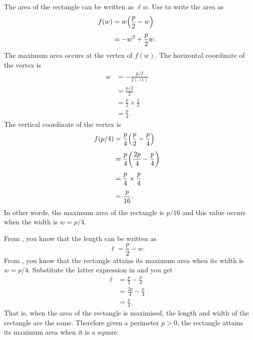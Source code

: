 \documentclass[a4paper,oneside,12pt]{article}
\begin{document}
\begin{problem}
{\begin{solution}
The area of the rectangle can be written as $\ell w$.
Use  to write the area as
\begin{align*}
f(w)
&=
w \parenthesis*{\frac{p}{2} - w} \\[4pt]
&=
-w^2 + \frac{p}{2}w.
\end{align*}
The maximum area occurs at the vertex of $f(w)$.  The horizontal
coordinate of the vertex is
\begin{align*}
w
&=
-\frac{p/2}{2(-1)} \\[4pt]
&=
\frac{p/2}{2} \\[4pt]
&=
\frac{p}{2} \times \frac{1}{2} \\[4pt]
&=
\frac{p}{4}.
\end{align*}
The vertical coordinate of the vertex is
\begin{align*}
f(p/4)
&=
\frac{p}{4}
\parenthesis*{
  \frac{p}{2} - \frac{p}{4}
} \\[4pt]
&=
\frac{p}{4}
\parenthesis*{
  \frac{2p}{4} - \frac{p}{4}
} \\[4pt]
&=
\frac{p}{4} \times \frac{p}{4} \\[4pt]
&=
\frac{p}{16}.
\end{align*}
In other words, the maximum area of the rectangle is $p / 16$ and this
value occurs when the width is $w = p / 4$.

From , you know that the length can
be written as
\begin{equation}
\label{eqn:rectangle_length_as_width_and_perimeter}
\ell
=
\frac{p}{2} - w.
\end{equation}
From , you know that the
rectangle attains its maximum area when its width is $w = p / 4$.
Substitute the latter expression in
 and you get
\begin{align*}
\ell
&=
\frac{p}{2} - \frac{p}{4} \\[4pt]
&=
\frac{2p}{4} - \frac{p}{4} \\[4pt]
&=
\frac{p}{4}.
\end{align*}
That is, when the area of the rectangle is maximised, the length and
width of the rectangle are the same.  Therefore given a perimeter
$p > 0$, the rectangle attains its maximum area when it is a square.
\end{solution}
}{}
\end{problem}
\end{document}
